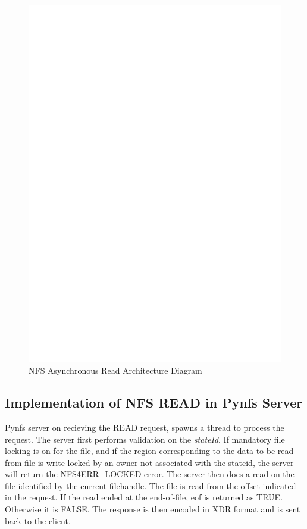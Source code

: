 \begin{figure}
\centering
\includegraphics[scale=0.7]{figures/AsyncRead.eps}
\caption{NFS Asynchronous Read Architecture Diagram}
\label{fig:NFSAsyncReadArch}
\end{figure}

\subsection{Implementation of NFS READ in Pynfs Server}
Pynfs server on recieving the READ request, spawns a thread to process the request. The server first performs validation on the \textit{stateId}. If mandatory file locking is on for the file, and if the region corresponding to the data to be read from file is write locked by an owner not associated with the stateid, the server will return the NFS4ERR\_LOCKED error.
The server then does a read on the file identified by the current filehandle. The file is read from the offset indicated in the request.  If the read ended at the end-of-file, eof is returned as  TRUE. Otherwise it is FALSE. The response is then encoded in XDR format and is sent back to the client.
	
